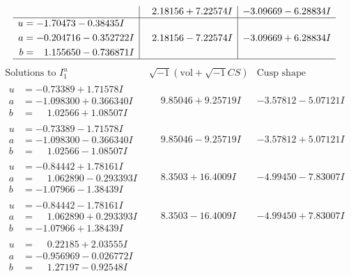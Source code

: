 \documentclass[1p]{elsarticle_modified}
\theoremstyle{definition}
\newcommand{\I}{\sqrt{-1}}
\begin{document}
$$\begin{array}{c|c|c}
 & \phantom{-}2.18156 + 7.22574 I & -3.09669 - 6.28834 I \\ \hline\begin{aligned}
u &= -1.70473 - 0.38435 I \\
a &= -0.204716 - 0.352722 I \\
b &= \phantom{-}1.155650 - 0.736871 I\end{aligned}
 & \phantom{-}2.18156 - 7.22574 I & -3.09669 + 6.28834 I\\
 \hline 
 \end{array}$$\newpage$$\begin{array}{c|c|c}  
\text{Solutions to }I^u_{1}& \I (\text{vol} + \sqrt{-1}CS) & \text{Cusp shape}\\
 \hline 
\begin{aligned}
u &= -0.73389 + 1.71578 I \\
a &= -1.098300 + 0.366340 I \\
b &= \phantom{-}1.02566 + 1.08507 I\end{aligned}
 & \phantom{-}9.85046 + 9.25719 I & -3.57812 - 5.07121 I \\ \hline\begin{aligned}
u &= -0.73389 - 1.71578 I \\
a &= -1.098300 - 0.366340 I \\
b &= \phantom{-}1.02566 - 1.08507 I\end{aligned}
 & \phantom{-}9.85046 - 9.25719 I & -3.57812 + 5.07121 I \\ \hline\begin{aligned}
u &= -0.84442 + 1.78161 I \\
a &= \phantom{-}1.062890 - 0.293393 I \\
b &= -1.07966 - 1.38439 I\end{aligned}
 & \phantom{-}8.3503 + 16.4009 I & -4.99450 - 7.83007 I \\ \hline\begin{aligned}
u &= -0.84442 - 1.78161 I \\
a &= \phantom{-}1.062890 + 0.293393 I \\
b &= -1.07966 + 1.38439 I\end{aligned}
 & \phantom{-}8.3503 - 16.4009 I & -4.99450 + 7.83007 I \\ \hline\begin{aligned}
u &= \phantom{-}0.22185 + 2.03555 I \\
a &= -0.956969 - 0.026772 I \\
b &= \phantom{-}1.27197 - 0.92548 I\end{aligned}

\end{array}$$
\end{document}
